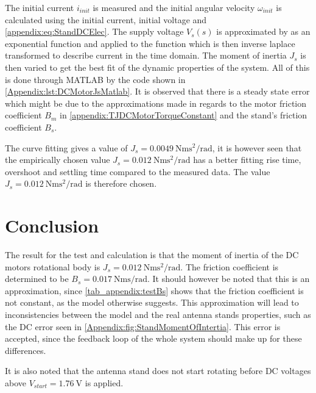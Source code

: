 The initial current $i_{init}$ is measured and the initial angular velocity $\omega_{init}$ is calculated using the initial current, initial voltage and \autoref{appendix:eq:StandDCElec}.
The supply voltage $V_s(s)$ is approximated by as an exponential function and applied to the function which is then inverse laplace transformed to describe current in the time domain.
The moment of inertia $J_s$ is then varied to get the best fit of the dynamic properties of the system. All of this is done through MATLAB by the code shown in \autoref{Appendix:lst:DCMotorJsMatlab}.
It is observed that there is a steady state error which might be due to the approximations made in regards to the motor friction coefficient $B_m$ in \autoref{appendix:TJDCMotorTorqueConstant} and the stand's friction coefficient $B_s$.


The curve fitting gives a value of $J_s = \SI{0.0049}{\newton\metre\second\squared\per\radian}$, it is however seen that the empirically chosen value $J_s = \SI{0.012}{\newton\metre\second\squared\per\radian}$ has a better fitting rise time, overshoot and settling time compared to the measured data. The value $J_s = \SI{0.012}{\newton\metre\second\squared\per\radian}$ is therefore chosen.

\section*{Conclusion}
The result for the test and calculation is that the moment of inertia of the DC motors rotational body is $J_s = \SI{0.012}{\newton\metre\second\squared\per\radian}$. The friction coefficient is determined to be $B_s =\SI{0.017}{\newton\metre\second\per\radian}$. It should however be noted that this is an approximation, since \autoref{tab_appendix:testBs} shows that the friction coefficient is not constant, as the model otherwise suggests. This approximation will lead to inconsistencies between the model and the real antenna stands properties, such as the DC error seen in \autoref{Appendix:fig:StandMomentOfIntertia}. This error is accepted, since the feedback loop of the whole system should make up for these differences.

It is also noted that the antenna stand does not start rotating before DC voltages above $V_{start} = \SI{1.76}{\volt}$ is applied.
